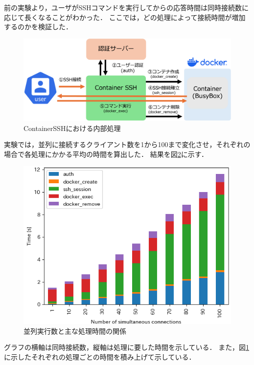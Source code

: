 \documentclass[dvipdfmx]{cs-handout}
\begin{document}
前の実験より，ユーザがSSHコマンドを実行してからの応答時間は同時接続数に応じて長くなることがわかった．
ここでは，どの処理によって接続時間が増加するのかを検証した．

%
\begin{figure}[tb]
\includegraphics[width=\linewidth]{./fig/step.png}
\caption{ContainerSSHにおける内部処理}
\label{fig:step}
\end{figure}
%


実験では，並列に接続するクライアント数を1から100まで変化させ，それぞれの場合で各処理にかかる平均の時間を算出した．
結果を図\ref{fig:detail}に示す．
%
\begin{figure}[tb]
\includegraphics[width=\linewidth]{./fig/detail.png}
\caption{並列実行数と主な処理時間の関係}
\label{fig:detail}
\end{figure}
%
グラフの横軸は同時接続数，縦軸は処理に要した時間を示している．
また，図\ref{fig:step}に示したそれぞれの処理ごとの時間を積み上げて示している．
\end{document}
